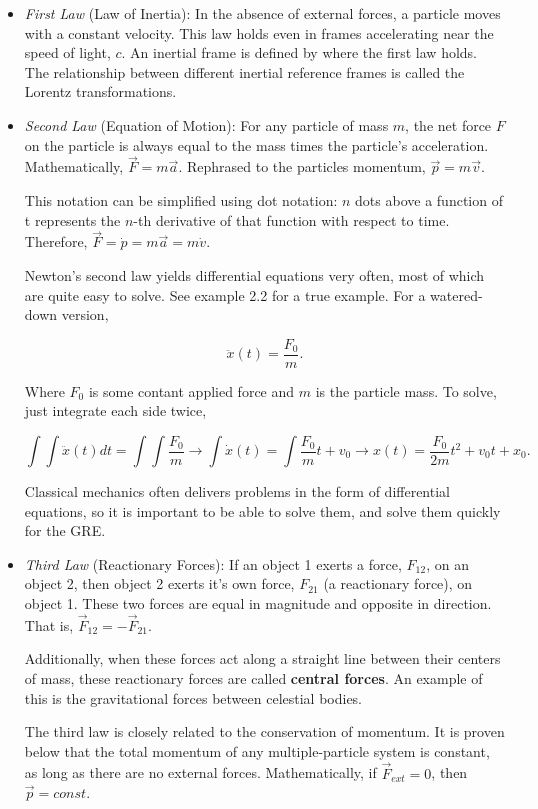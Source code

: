 \begin{itemize}
    \item {\itshape First Law} (Law of Inertia): In the absence of external forces, a particle moves with a constant velocity. This law holds even in frames accelerating near the speed of light, $c$. An inertial frame is defined by where the first law holds. The relationship between different inertial reference frames is called the Lorentz transformations.
    
    \item{\itshape Second Law} (Equation of Motion): For any particle of mass $m$, the net force $F$ on the particle is always equal to the mass times the particle's acceleration. Mathematically, $\vec{F} = m \vec{a}$. Rephrased to the particles momentum, $\vec{p} = m \vec{v}$.
    
    This notation can be simplified using dot notation: $n$ dots above a function of t represents the $n$-th derivative of that function with respect to time. Therefore, $\vec{F} = \dot p = m \vec{a} = m \dot v$.
    
    Newton's second law yields differential equations very often, most of which are quite easy to solve. See example 2.2 for a true example. For a watered-down version,
    
    \begin{equation*}
        \ddot x(t) = \frac{F_0}{m}.
    \end{equation*}
    
    \noindent Where $F_0$ is some contant applied force and $m$ is the particle mass. To solve, just integrate each side twice,
    
    \begin{equation*}
        \int \int \ddot x(t) dt = \int \int \frac{F_0}{m} \rightarrow \int \dot x(t) = \int \frac{F_0}{m}t + v_0 \rightarrow x(t) = \frac{F_0}{2m}t^2 + v_0t + x_0.
    \end{equation*}
    
    Classical mechanics often delivers problems in the form of differential equations, so it is important to be able to solve them, and solve them quickly for the GRE.
    
    \item{\itshape Third Law} (Reactionary Forces): If an object 1 exerts a force, $F_{12}$, on an object 2, then object 2 exerts it's own force, $F_{21}$ (a reactionary force), on object 1. These two forces are equal in magnitude and opposite in direction. That is, $\vec{F}_{12} = -\vec{F}_{21}$.
    
    Additionally, when these forces act along a straight line between their centers of mass, these reactionary forces are called {\bfseries central forces}. An example of this is the gravitational forces between celestial bodies.
    
    The third law is closely related to the conservation of momentum. It is proven below that the total momentum of any multiple-particle system is constant, as long as there are no external forces. Mathematically, if $\vec{F}_{ext} = 0$, then $\vec{p} = const.$
\end{itemize}


